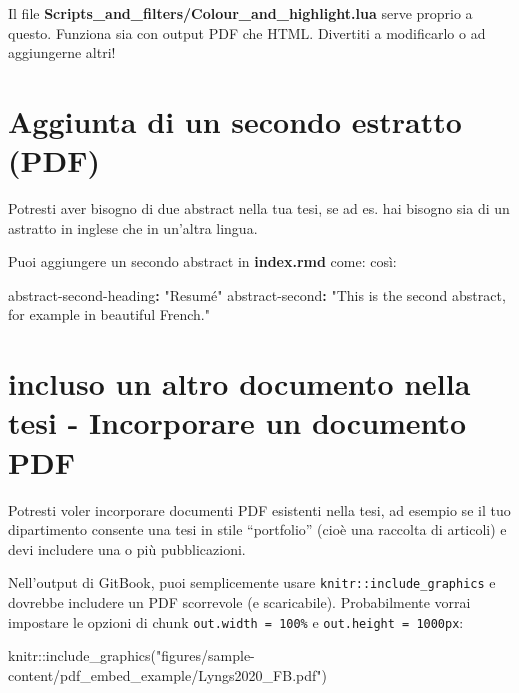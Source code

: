 \documentclass[a4paper, 11pt, nobind]{templates/ociamthesis}
\newenvironment{Shaded}{\begin{snugshade}}{\end{snugshade}}
\newcommand{\AttributeTok}[1]{\textcolor[rgb]{0.77,0.63,0.00}{#1}}
\newcommand{\FunctionTok}[1]{\textcolor[rgb]{0.00,0.00,0.00}{#1}}
\newcommand{\KeywordTok}[1]{\textcolor[rgb]{0.13,0.29,0.53}{\textbf{#1}}}
\newcommand{\NormalTok}[1]{#1}
\newcommand{\SpecialCharTok}[1]{\textcolor[rgb]{0.00,0.00,0.00}{#1}}
\newcommand{\StringTok}[1]{\textcolor[rgb]{0.31,0.60,0.02}{#1}}
\renewenvironment{Shaded}
{
  \vspace{10pt}%
  \begin{snugshade}%
}{%
  \end{snugshade}%
  \vspace{8pt}%
}
\begin{document}
Il file \textbf{Scripts\_and\_filters/Colour\_and\_highlight.lua } serve proprio a questo. Funziona sia con output PDF che HTML. Divertiti a modificarlo o ad aggiungerne altri!

\hypertarget{aggiunta-di-un-secondo-estratto-pdf}{%
\section{Aggiunta di un secondo estratto (PDF)}\label{aggiunta-di-un-secondo-estratto-pdf}}

Potresti aver bisogno di due abstract nella tua tesi, se ad es. hai bisogno sia di un astratto in inglese che in un'altra lingua.

Puoi aggiungere un secondo abstract in \textbf{index.rmd } come: così:

\begin{Shaded}
\begin{Highlighting}[]
\FunctionTok{abstract{-}second{-}heading}\KeywordTok{:}\AttributeTok{ }\StringTok{"Resumé"}
\FunctionTok{abstract{-}second}\KeywordTok{:}\AttributeTok{ }\StringTok{"This is the second abstract, for example in beautiful French."}\AttributeTok{ }
\end{Highlighting}
\end{Shaded}

\hypertarget{embed-pdf}{%
\section{incluso un altro documento nella tesi - Incorporare un documento PDF}\label{embed-pdf}}

Potresti voler incorporare documenti PDF esistenti nella tesi, ad esempio se il tuo dipartimento consente una tesi in stile ``portfolio'' (cioè una raccolta di articoli) e devi includere una o più pubblicazioni.

Nell'output di GitBook, puoi semplicemente usare \texttt{knitr::include\_graphics} e dovrebbe includere un PDF scorrevole (e scaricabile).
Probabilmente vorrai impostare le opzioni di chunk \texttt{out.width\ =\ \textquotesingle{}100\%\textquotesingle{}} e \texttt{out.height\ =\ \textquotesingle{}1000px\textquotesingle{}}:

\begin{Shaded}
\begin{Highlighting}[]
\NormalTok{knitr}\SpecialCharTok{::}\FunctionTok{include\_graphics}\NormalTok{(}\StringTok{"figures/sample{-}content/pdf\_embed\_example/Lyngs2020\_FB.pdf"}\NormalTok{)}
\end{Highlighting}
\end{Shaded}
\end{document}
